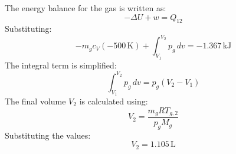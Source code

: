 The energy balance for the gas is written as:  
\[
-\Delta U + w = Q_{12}
\]  
Substituting:  
\[
-m_g c_V (-500 \, \text{K}) + \int_{V_1}^{V_2} p_g \, dv = -1.367 \, \text{kJ}
\]  
The integral term is simplified:  
\[
\int_{V_1}^{V_2} p_g \, dv = p_g (V_2 - V_1)
\]  
The final volume \( V_2 \) is calculated using:  
\[
V_2 = \frac{m_g R T_{g,2}}{p_g M_g}
\]  
Substituting the values:  
\[
V_2 = 1.105 \, \text{L}
\]
